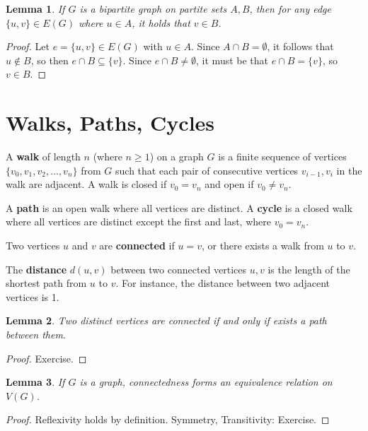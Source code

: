\documentclass[a4paper,12pt]{article}
\newtheorem{lemma}{Lemma}
\begin{document}
\begin{lemma}
If $G$ is a bipartite graph on partite sets $A, B$, then for any edge
$\{u,v\} \in E(G)$ where $u \in A$, it holds that $v \in B$.
\end{lemma}

\begin{proof}
Let $e = \{u,v\} \in E(G)$ with $u \in A$. Since $A \cap B = \emptyset$, it
follows that $u \not\in B$, so then $e \cap B \subseteq \{v\}$.
Since $e \cap B \neq \emptyset$, it must be that $e \cap B = \{v\}$, so
$v \in B$.
\end{proof}

\section{Walks, Paths, Cycles}

A {\bf walk} of length $n$ (where $n \geq 1$)
on a graph $G$ is a finite sequence of vertices
$\{v_0, v_1, v_2, \dots, v_n\}$ from $G$ such that
each pair of consecutive vertices $v_{i-1},v_i$ in the walk are adjacent.
A walk is closed if $v_0 = v_n$ and open if $v_0 \neq v_n$.

A {\bf path} is an open walk where all vertices are distinct.
A {\bf cycle} is a closed walk where all vertices are distinct except the first
and last, where $v_0 = v_n$.

Two vertices $u$ and $v$ are {\bf connected} if $u = v$, or
there exists a walk from $u$ to $v$.

The {\bf distance} $d(u, v)$ between two connected vertices $u, v$ is the length
of the shortest path from $u$ to $v$. For instance, the distance between two
adjacent vertices is 1.

\begin{lemma}
Two distinct vertices are connected if and only if exists a path between them.
\end{lemma}

\begin{proof} Exercise. \end{proof} %

\begin{lemma}
If $G$ is a graph, connectedness forms an equivalence relation on $V(G)$.
\end{lemma}

\begin{proof} Reflexivity holds by definition.
Symmetry, Transitivity: Exercise. \end{proof} %
\end{document}

